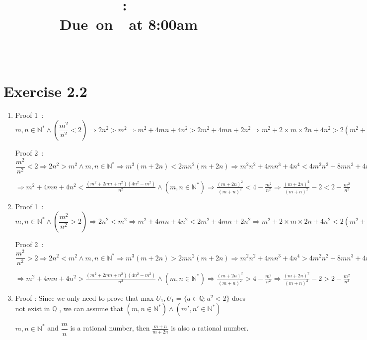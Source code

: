 \documentclass{article}
\title{
    \vspace{2in}
    \textmd{\textbf{\hmwkClass:\ \hmwkTitle}}\\
    \normalsize\vspace{0.1in}\small{Due\ on\ \hmwkDueDate\ at 8:00am}\\
    \vspace{0.1in}\large{\textit{\hmwkClassInstructor\ \hmwkClassTime}}
    \vspace{3in}
}
\author{\textbf{\hmwkAuthorName}}
\date{}
\begin{document}
\maketitle

\pagebreak



\section{Exercise 2.2}
\begin{enumerate}
    \item Proof 1\ :  $ m,n\in \mathbb{N}^*  \wedge (\dfrac{m^2}{n^2}<2)\Rightarrow
     2n^2>m^2 \Rightarrow 
     m^2+4mn+4n^2>2m^2+4mn+2n^2 \Rightarrow 
     m^2+2\times m\times 2n+4n^2>2(m^2+2mn+n^2) \Rightarrow
      (m+2n)^2 >2(m+n)^2 \Rightarrow 
      \dfrac{(m+2n)^2}{(m+n)^2}>2 $
    
    Proof 2\ : $ \dfrac{m^2}{n^2}<2\Rightarrow   
    2n^2>m^2 \wedge m,n\in \mathbb{N}^*	\Rightarrow	
    m^3(m+2n)<2mn^2(m+2n)	\Rightarrow
    m^2n^2+4mn^3+4n^4<4m^2n^2+8mn^3+4n^4-m^4-2m^3n-m^2n^2	\wedge (n\neq 0) $ 
    
    $ \Rightarrow   m^2+4mn+4n^2<\frac{\left(m^2+2 m n+n^2\right) \left(4 n^2-m^2\right)}{n^2} \wedge (m,n\in \mathbb{N}^* )	\Rightarrow	
    \frac{(m+2 n)^2}{(m+n)^2}<4-\frac{m^2}{n^2} \Rightarrow
    \frac{(m+2 n)^2}{(m+n)^2}-2<2-\frac{m^2}{n^2}
    							$
    							
    \item Proof 1\ :  $ m,n\in \mathbb{N}^*  \wedge (\dfrac{m^2}{n^2}>2)\Rightarrow
    2n^2<m^2 \Rightarrow 
    m^2+4mn+4n^2<2m^2+4mn+2n^2 \Rightarrow 
    m^2+2\times m\times 2n+4n^2<2(m^2+2mn+n^2) \Rightarrow
    (m+2n)^2 <2(m+n)^2 \Rightarrow 
    \dfrac{(m+2n)^2}{(m+n)^2}<2 $
    
    Proof 2\ : $ \dfrac{m^2}{n^2}>2\Rightarrow   
    2n^2<m^2 \wedge m,n\in \mathbb{N}^*	\Rightarrow	
    m^3(m+2n)>2mn^2(m+2n)	\Rightarrow
    m^2n^2+4mn^3+4n^4>4m^2n^2+8mn^3+4n^4-m^4-2m^3n-m^2n^2	\wedge (n\neq 0) $ 
    
    $\Rightarrow    m^2+4mn+4n^2>\frac{\left(m^2+2 m n+n^2\right) \left(4 n^2-m^2\right)}{n^2} \wedge (m,n\in \mathbb{N}^* )	\Rightarrow	
    \frac{(m+2 n)^2}{(m+n)^2}>4-\frac{m^2}{n^2} \Rightarrow
    \frac{(m+2 n)^2}{(m+n)^2}-2>2-\frac{m^2}{n^2}
    $				
    
    \item Proof : Since we only need to prove that max $U_1,U_1=\{a\in \mathbb{Q} \colon a^2<2 \}$ does not exist in $\mathbb{Q}$ , we can assume that $ (m,n\in \mathbb{N}^* )\wedge  (m',n'\in \mathbb{N}^* )	$
    
    $m,n\in \mathbb{N}^*$ and $\dfrac{m}{n}$ is a rational number, then $\frac{m+n}{m+2 n}$ is also a rational number.
    							

\end{enumerate}
\end{document}
